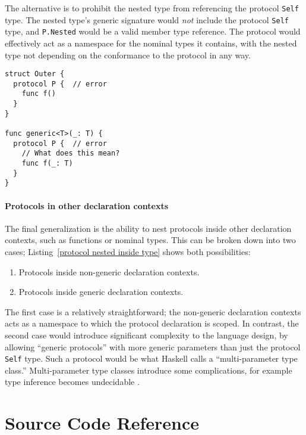 \documentclass[../generics]{subfiles}
\begin{document}
The alternative is to prohibit the nested type from referencing the protocol \texttt{Self} type. The nested type's generic signature would \emph{not} include the protocol \texttt{Self} type, and \texttt{P.Nested} would be a valid member type reference. The protocol would effectively act as a namespace for the nominal types it contains, with the nested type not depending on the conformance to the protocol in any way.

\begin{listing}\label{protocol nested inside type}
\begin{Verbatim}
struct Outer {
  protocol P {  // error
    func f()
  }
}

func generic<T>(_: T) {
  protocol P {  // error
    // What does this mean?
    func f(_: T)
  }
}
\end{Verbatim}
\end{listing}

\paragraph{Protocols in other declaration contexts} The final generalization is the ability to nest protocols inside other declaration contexts, such as functions or nominal types. This can be broken down into two cases; Listing~\ref{protocol nested inside type} shows both possibilities:
\begin{enumerate}
\item Protocols inside non-generic declaration contexts.
\item Protocols inside generic declaration contexts.
\end{enumerate}
The first case is a relatively straightforward; the non-generic declaration contexts acts as a namespace to which the protocol declaration is scoped. In contrast, the second case would introduce significant complexity to the language design, by allowing ``generic protocols'' with more generic parameters than just the protocol \texttt{Self} type. Such a protocol would be what Haskell calls a ``multi-parameter type class.'' Multi-parameter type classes introduce some complications, for example type inference becomes undecidable \cite{mptc}.

\section{Source Code Reference}\label{substmapsourcecoderef}
\end{document}
